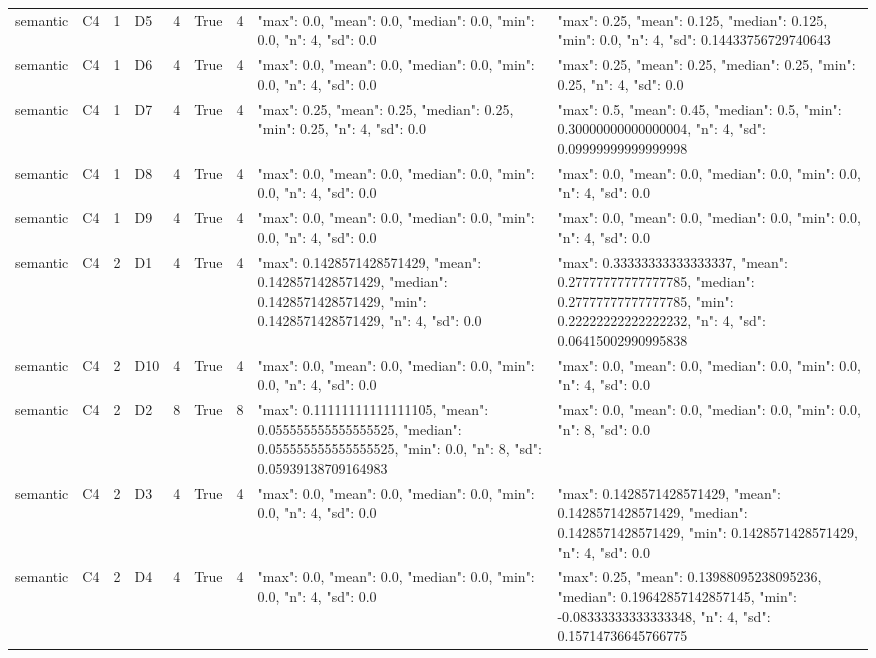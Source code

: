 \begin{tabular}{lllllllll}
semantic & C4 & 1 & D5 & 4 & True & 4 & {"max": 0.0, "mean": 0.0, "median": 0.0, "min": 0.0, "n": 4, "sd": 0.0} & {"max": 0.25, "mean": 0.125, "median": 0.125, "min": 0.0, "n": 4, "sd": 0.14433756729740643} \\
semantic & C4 & 1 & D6 & 4 & True & 4 & {"max": 0.0, "mean": 0.0, "median": 0.0, "min": 0.0, "n": 4, "sd": 0.0} & {"max": 0.25, "mean": 0.25, "median": 0.25, "min": 0.25, "n": 4, "sd": 0.0} \\
semantic & C4 & 1 & D7 & 4 & True & 4 & {"max": 0.25, "mean": 0.25, "median": 0.25, "min": 0.25, "n": 4, "sd": 0.0} & {"max": 0.5, "mean": 0.45, "median": 0.5, "min": 0.30000000000000004, "n": 4, "sd": 0.09999999999999998} \\
semantic & C4 & 1 & D8 & 4 & True & 4 & {"max": 0.0, "mean": 0.0, "median": 0.0, "min": 0.0, "n": 4, "sd": 0.0} & {"max": 0.0, "mean": 0.0, "median": 0.0, "min": 0.0, "n": 4, "sd": 0.0} \\
semantic & C4 & 1 & D9 & 4 & True & 4 & {"max": 0.0, "mean": 0.0, "median": 0.0, "min": 0.0, "n": 4, "sd": 0.0} & {"max": 0.0, "mean": 0.0, "median": 0.0, "min": 0.0, "n": 4, "sd": 0.0} \\
semantic & C4 & 2 & D1 & 4 & True & 4 & {"max": 0.1428571428571429, "mean": 0.1428571428571429, "median": 0.1428571428571429, "min": 0.1428571428571429, "n": 4, "sd": 0.0} & {"max": 0.33333333333333337, "mean": 0.27777777777777785, "median": 0.27777777777777785, "min": 0.22222222222222232, "n": 4, "sd": 0.06415002990995838} \\
semantic & C4 & 2 & D10 & 4 & True & 4 & {"max": 0.0, "mean": 0.0, "median": 0.0, "min": 0.0, "n": 4, "sd": 0.0} & {"max": 0.0, "mean": 0.0, "median": 0.0, "min": 0.0, "n": 4, "sd": 0.0} \\
semantic & C4 & 2 & D2 & 8 & True & 8 & {"max": 0.11111111111111105, "mean": 0.055555555555555525, "median": 0.055555555555555525, "min": 0.0, "n": 8, "sd": 0.05939138709164983} & {"max": 0.0, "mean": 0.0, "median": 0.0, "min": 0.0, "n": 8, "sd": 0.0} \\
semantic & C4 & 2 & D3 & 4 & True & 4 & {"max": 0.0, "mean": 0.0, "median": 0.0, "min": 0.0, "n": 4, "sd": 0.0} & {"max": 0.1428571428571429, "mean": 0.1428571428571429, "median": 0.1428571428571429, "min": 0.1428571428571429, "n": 4, "sd": 0.0} \\
semantic & C4 & 2 & D4 & 4 & True & 4 & {"max": 0.0, "mean": 0.0, "median": 0.0, "min": 0.0, "n": 4, "sd": 0.0} & {"max": 0.25, "mean": 0.13988095238095236, "median": 0.19642857142857145, "min": -0.08333333333333348, "n": 4, "sd": 0.15714736645766775} \\

\end{tabular}
